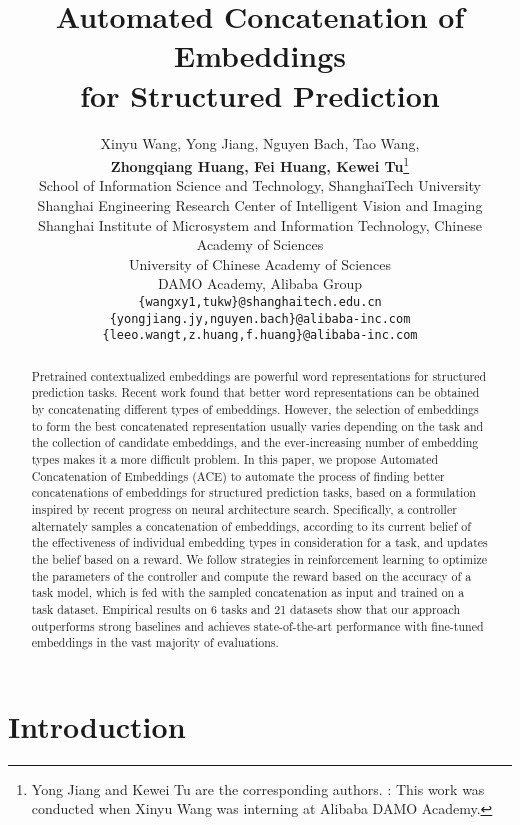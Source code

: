 \documentclass{article} \usepackage{iclr2021_conference,times}
\title{Automated Concatenation of Embeddings \\for Structured Prediction}
\author{Xinyu Wang, Yong Jiang\textsuperscript{}, Nguyen Bach, Tao Wang,\\
\textbf{Zhongqiang Huang, Fei Huang,  Kewei Tu}\thanks{Yong Jiang and Kewei Tu are the corresponding authors. : This work was conducted when Xinyu Wang was interning at Alibaba DAMO Academy.} \\
 School of Information Science and Technology, ShanghaiTech University \\
 Shanghai Engineering Research Center of Intelligent Vision and Imaging \\
 Shanghai Institute of Microsystem and Information Technology, Chinese Academy of Sciences \\
 University of Chinese Academy of Sciences \\
 DAMO Academy, Alibaba Group \\
  {\tt \{wangxy1,tukw\}@shanghaitech.edu.cn} \\
  {\tt \{yongjiang.jy,nguyen.bach\}@alibaba-inc.com} \\
  {\tt \{leeo.wangt,z.huang,f.huang\}@alibaba-inc.com} \\
}
\begin{document}
\maketitle

\begin{abstract}
Pretrained contextualized embeddings are powerful word representations for structured prediction tasks. Recent work found that better word representations can be obtained by concatenating different types of embeddings. However, the selection of embeddings to form the best concatenated representation usually varies depending on the task and the collection of candidate embeddings, and the ever-increasing number of embedding types makes it a more difficult problem. In this paper, we propose Automated Concatenation of Embeddings (ACE) to automate the process of finding better concatenations of embeddings for structured prediction tasks, based on a formulation inspired by recent progress on neural architecture search. Specifically, a controller alternately samples a concatenation of embeddings, according to its current belief of the effectiveness of individual embedding types in consideration for a task, and updates the belief based on a reward. We follow strategies in reinforcement learning to optimize the parameters of the controller and compute the reward based on the accuracy of a task model, which is fed with the sampled concatenation as input and trained on a task dataset. Empirical results on 6 tasks and 21 datasets show that our approach outperforms strong baselines and achieves state-of-the-art performance with fine-tuned embeddings in the vast majority of evaluations.




\end{abstract}

\section{Introduction}
\end{document}
